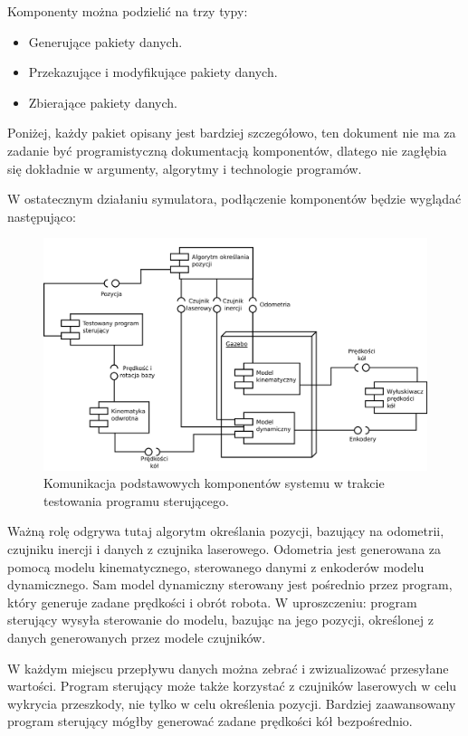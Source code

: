 Komponenty można podzielić na trzy typy:
\begin{itemize}
	\item Generujące pakiety danych.
	\item Przekazujące i modyfikujące pakiety danych.
	\item Zbierające pakiety danych.
\end{itemize}
Poniżej, każdy pakiet opisany jest bardziej szczegółowo, ten dokument nie ma za zadanie być programistyczną dokumentacją komponentów, dlatego 
nie zagłębia się dokładnie w argumenty, algorytmy i technologie programów.

W ostatecznym działaniu symulatora, podłączenie komponentów będzie wyglądać następująco:
\begin{figure}[H]
	\centering
	\includegraphics[width=\textwidth]{uml/final.pdf}
	\caption{Komunikacja podstawowych komponentów systemu w trakcie testowania programu sterującego.}
\end{figure} 

Ważną rolę odgrywa tutaj algorytm określania pozycji, bazujący na odometrii, czujniku inercji i danych z czujnika laserowego.
Odometria jest generowana za pomocą modelu kinematycznego, sterowanego danymi z enkoderów modelu dynamicznego.
Sam model dynamiczny sterowany jest pośrednio przez program, który generuje zadane prędkości i obrót robota.
W uproszczeniu: program sterujący wysyła sterowanie do modelu, bazując na jego pozycji, określonej z danych generowanych przez modele czujników.

W każdym miejscu przepływu danych można zebrać i zwizualizować przesyłane wartości.
Program sterujący może także korzystać z czujników laserowych w celu wykrycia przeszkody, nie tylko w celu określenia pozycji.
Bardziej zaawansowany program sterujący mógłby generować zadane prędkości kół bezpośrednio.

